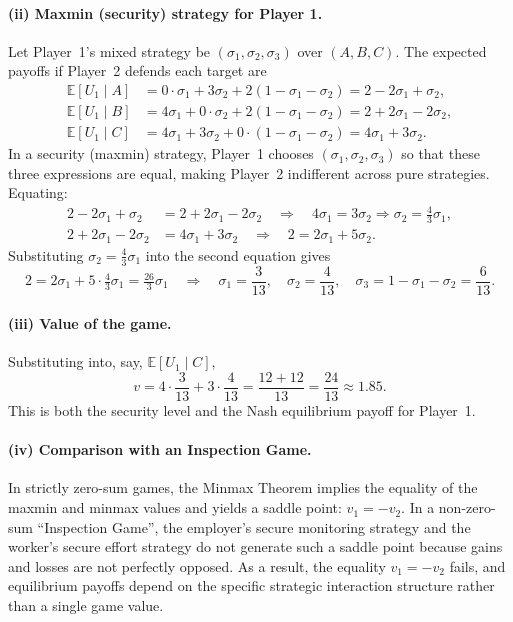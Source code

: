 \documentclass[12pt,a4paper]{article}
\begin{document}
\paragraph{(ii) Maxmin (security) strategy for Player 1.}
Let Player~1's mixed strategy be \((\sigma_1,\sigma_2,\sigma_3)\) over \((A,B,C)\). The expected payoffs if Player~2 defends each target are
\begin{align*}
  \mathbb{E}[U_1 \mid A] &= 0\cdot \sigma_1 + 3\sigma_2 + 2(1-\sigma_1-\sigma_2)
    = 2 - 2\sigma_1 + \sigma_2,\\
  \mathbb{E}[U_1 \mid B] &= 4\sigma_1 + 0\cdot \sigma_2 + 2(1-\sigma_1-\sigma_2)
    = 2 + 2\sigma_1 - 2\sigma_2,\\
  \mathbb{E}[U_1 \mid C] &= 4\sigma_1 + 3\sigma_2 + 0\cdot (1-\sigma_1-\sigma_2)
    = 4\sigma_1 + 3\sigma_2.
\end{align*}
In a security (maxmin) strategy, Player~1 chooses \((\sigma_1,\sigma_2,\sigma_3)\) so that these three expressions are equal, making Player~2 indifferent across pure strategies. Equating:
\begin{align*}
  2 - 2\sigma_1 + \sigma_2 &= 2 + 2\sigma_1 - 2\sigma_2
  \quad\Rightarrow\quad 4\sigma_1 = 3\sigma_2 \Rightarrow \sigma_2 = \tfrac{4}{3}\sigma_1,\\
  2 + 2\sigma_1 - 2\sigma_2 &= 4\sigma_1 + 3\sigma_2
  \quad\Rightarrow\quad
  2 = 2\sigma_1 + 5\sigma_2.
\end{align*}
Substituting \(\sigma_2 = \tfrac{4}{3}\sigma_1\) into the second equation gives
\[
  2 = 2\sigma_1 + 5\cdot \tfrac{4}{3}\sigma_1 = \tfrac{26}{3}\sigma_1
  \quad\Rightarrow\quad
  \sigma_1 = \frac{3}{13},\quad
  \sigma_2 = \frac{4}{13},\quad
  \sigma_3 = 1 - \sigma_1 - \sigma_2 = \frac{6}{13}.
\]

\paragraph{(iii) Value of the game.}
Substituting into, say, \(\mathbb{E}[U_1 \mid C]\),
\[
  v
  = 4\cdot \frac{3}{13} + 3\cdot \frac{4}{13}
  = \frac{12 + 12}{13}
  = \frac{24}{13}
  \approx 1.85.
\]
This is both the security level and the Nash equilibrium payoff for Player~1.

\paragraph{(iv) Comparison with an Inspection Game.}
In strictly zero-sum games, the Minmax Theorem implies the equality of the maxmin and minmax values and yields a saddle point: \(v_1 = -v_2\). In a non-zero-sum ``Inspection Game'', the employer's secure monitoring strategy and the worker's secure effort strategy do not generate such a saddle point because gains and losses are not perfectly opposed. As a result, the equality \(v_1 = -v_2\) fails, and equilibrium payoffs depend on the specific strategic interaction structure rather than a single game value.
\end{document}
